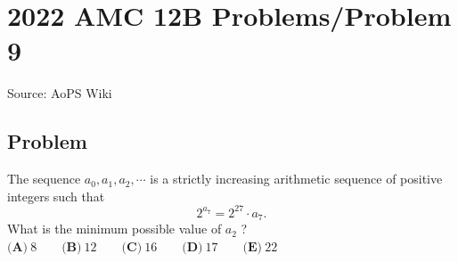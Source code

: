 \documentclass[12pt]{article}
\begin{document}
\section*{{2022 AMC 12B Problems/Problem 9}}
Source: AoPS Wiki

\subsection*{Problem}
The sequence $a_0,a_1,a_2,\cdots$ is a strictly increasing arithmetic sequence of positive integers such that \[2^{a_7}=2^{27} \cdot a_7.\] What is the minimum possible value of $a_2$ ? $\textbf{(A)}\ 8 \qquad \textbf{(B)}\ 12 \qquad \textbf{(C)}\ 16 \qquad \textbf{(D)}\ 17 \qquad \textbf{(E)}\ 22$
\end{document}
